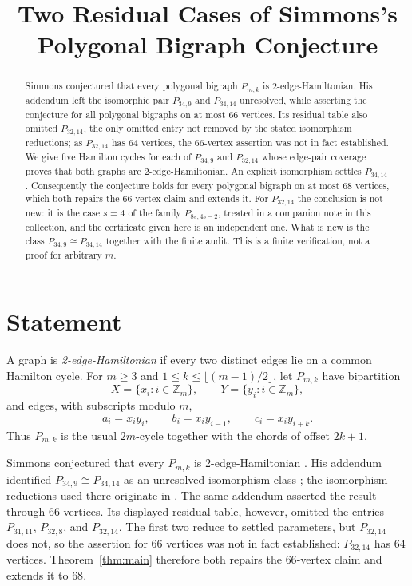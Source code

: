 \documentclass[11pt]{amsart}
\title[Two residual polygonal bigraphs]
{Two Residual Cases of Simmons's Polygonal Bigraph Conjecture}
\date{}
\newcommand{\Z}{\mathbb Z}
\begin{document}
\begin{abstract}
Simmons conjectured that every polygonal bigraph $P_{m,k}$ is
2-edge-Hamiltonian. His addendum left the isomorphic pair
$P_{34,9}$ and $P_{34,14}$ unresolved, while asserting the conjecture for
all polygonal bigraphs on at most $66$ vertices. Its residual table also
omitted $P_{32,14}$, the only omitted entry not removed by the stated
isomorphism reductions; as $P_{32,14}$ has $64$ vertices, the $66$-vertex
assertion was not in fact established. We give five Hamilton cycles for
each of $P_{34,9}$ and $P_{32,14}$ whose edge-pair coverage proves that
both graphs are 2-edge-Hamiltonian. An explicit isomorphism settles
$P_{34,14}$. Consequently the conjecture holds for every polygonal
bigraph on at most $68$ vertices, which both repairs the $66$-vertex
claim and extends it. For $P_{32,14}$ the conclusion is not new: it is
the case $s=4$ of the family $P_{8s,4s-2}$, treated in a companion note
in this collection, and the certificate given here is an independent one.
What is new is the class $P_{34,9}\cong P_{34,14}$ together with the
finite audit. This is a finite verification, not a proof for arbitrary $m$.
\end{abstract}

\maketitle

\section{Statement}

A graph is \emph{2-edge-Hamiltonian} if every two distinct edges lie on a
common Hamilton cycle. For $m\ge 3$ and
$1\le k\le \lfloor(m-1)/2\rfloor$, let $P_{m,k}$ have bipartition
\[
 X=\{x_i:i\in\Z_m\},
 \qquad
 Y=\{y_i:i\in\Z_m\},
\]
and edges, with subscripts modulo $m$,
\[
 a_i=x_i y_i,
 \qquad
 b_i=x_i y_{i-1},
 \qquad
 c_i=x_i y_{i+k}.
\]
Thus $P_{m,k}$ is the usual $2m$-cycle together with the chords of offset
$2k+1$.

Simmons conjectured that every $P_{m,k}$ is 2-edge-Hamiltonian
\cite{Simmons2020}. His addendum identified
$P_{34,9}\cong P_{34,14}$ as an unresolved isomorphism class
\cite{SimmonsAddendum}; the isomorphism reductions used there originate in
\cite{Simmons2016}. The same addendum asserted the result through
$66$ vertices. Its displayed residual table, however, omitted the entries
$P_{31,11}$, $P_{32,8}$, and $P_{32,14}$. The first two reduce to settled
parameters, but $P_{32,14}$ does not, so the assertion for $66$ vertices
was not in fact established: $P_{32,14}$ has $64$ vertices.
Theorem~\ref{thm:main} therefore both repairs the $66$-vertex claim and
extends it to $68$.
\end{document}
